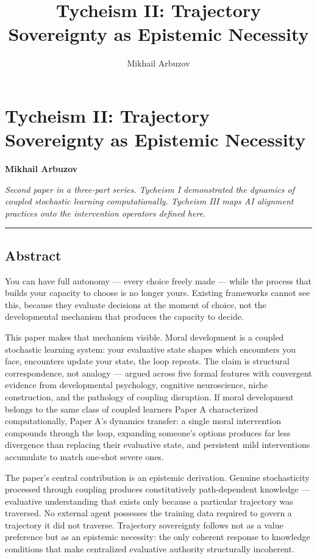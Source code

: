 \documentclass[
]{article}
\title{Tycheism II: Trajectory Sovereignty as Epistemic Necessity}
\author{Mikhail Arbuzov}
\date{}
\begin{document}
\maketitle

\section{Tycheism II: Trajectory Sovereignty as Epistemic
Necessity}\label{tycheism-ii-trajectory-sovereignty-as-epistemic-necessity}

\textbf{Mikhail Arbuzov}

\emph{Second paper in a three-part series. Tycheism I demonstrated the
dynamics of coupled stochastic learning computationally. Tycheism III
maps AI alignment practices onto the intervention operators defined
here.}

\begin{center}\rule{0.5\linewidth}{0.5pt}\end{center}

\subsection{Abstract}\label{abstract}

You can have full autonomy --- every choice freely made --- while the
process that builds your capacity to choose is no longer yours. Existing
frameworks cannot see this, because they evaluate decisions at the
moment of choice, not the developmental mechanism that produces the
capacity to decide.

This paper makes that mechanism visible. Moral development is a coupled
stochastic learning system: your evaluative state shapes which
encounters you face, encounters update your state, the loop repeats. The
claim is structural correspondence, not analogy --- argued across five
formal features with convergent evidence from developmental psychology,
cognitive neuroscience, niche construction, and the pathology of
coupling disruption. If moral development belongs to the same class of
coupled learners Paper A characterized computationally, Paper A's
dynamics transfer: a single moral intervention compounds through the
loop, expanding someone's options produces far less divergence than
replacing their evaluative state, and persistent mild interventions
accumulate to match one-shot severe ones.

The paper's central contribution is an epistemic derivation. Genuine
stochasticity processed through coupling produces constitutively
path-dependent knowledge --- evaluative understanding that exists only
because a particular trajectory was traversed. No external agent
possesses the training data required to govern a trajectory it did not
traverse. Trajectory sovereignty follows not as a value preference but
as an epistemic necessity: the only coherent response to knowledge
conditions that make centralized evaluative authority structurally
incoherent.
\end{document}
